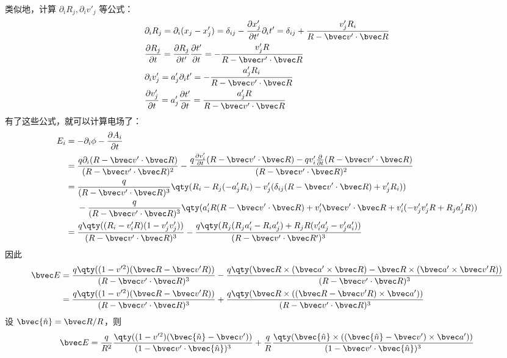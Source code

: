 类似地，计算 $\partial_i R_j,\partial_i v'_j$ 等公式：
\begin{equation}
\begin{aligned}
&\partial_i R_j=\partial_i(x_j-x_j')=\delta_{ij}-\frac{\partial x_j'}{\partial t'}\partial_i t'=\delta_{ij}+\frac{v'_jR_i}{R-\bvec v'\cdot \bvec R}
\\
&\frac{\partial R_j}{\partial t}=\frac{\partial R_j}{\partial t'}\frac{\partial t'}{\partial t}=-\frac{v'_jR}{R-\bvec r'\cdot \bvec R}
\\
&\partial_i v'_j=a'_j\partial_i t'=-\frac{a'_jR_i}{R-\bvec v'\cdot \bvec R}\\
&\frac{\partial v'_j}{\partial t}=a_j'\frac{\partial t'}{\partial t}=\frac{a_j'R}{R-\bvec v'\cdot \bvec R}
\end{aligned}
\end{equation}
有了这些公式，就可以计算电场了：
\begin{equation}
\begin{aligned}
E_i&=-\partial_i \phi - \frac{\partial A_i}{\partial t}
\\
&=\frac{q \partial_i (R-\bvec v'\cdot \bvec R)}{(R-\bvec v'\cdot \bvec R)^2}-\frac{q\frac{\partial v'_i}{\partial t}(R-\bvec v'\cdot \bvec R)-qv'_i\frac{\partial}{\partial t}(R-\bvec v'\cdot \bvec R)}{(R-\bvec v'\cdot \bvec R)^2}
\\
&=\frac{q}{(R-\bvec v'\cdot \bvec R)^3}\qty(R_i-R_j(-a_j'R_i)-v'_j(\delta_{ij}(R-\bvec v'\cdot \bvec R)+v'_jR_i))
\\
&\ \ \ \ -\frac{q}{(R-\bvec v'\cdot \bvec R)^3}\qty(a'_iR(R-\bvec v'\cdot \bvec R)+v'_i\bvec v'\cdot \bvec R+v'_i(-v'_jv'_jR+R_ja'_jR))
\\
&=\frac{q\qty((R_i-v_i'R)(1-v'_jv'_j))}{(R-\bvec v'\cdot \bvec R)^3}-\frac{q\qty(R_j(R_ja'_i-R_ia'_j)+R_jR(v'_ia'_j-v'_ja'_i))}{(R-\bvec v'\cdot \bvec R')^3}\\
\end{aligned}
\end{equation}
因此
\begin{equation}\label{chgrad_eq1}
\begin{aligned}
\bvec E&=\frac{q\qty((1-v'^2)(\bvec R-\bvec v'R))}{(R-\bvec v'\cdot \bvec R)^3}-\frac{q\qty(\bvec R\times (\bvec a'\times \bvec R)- \bvec R\times (\bvec a'\times \bvec v'R))}{(R-\bvec v'\cdot \bvec R)^3}\\
&=\frac{q\qty((1-v'^2)(\bvec R-\bvec v'R))}{(R-\bvec v'\cdot \bvec R)^3}+\frac{q\qty(\bvec R\times ((\bvec R-\bvec v'R)\times \bvec a'))}{(R-\bvec v'\cdot \bvec R)^3}
\end{aligned}
\end{equation}
设 $\bvec{\hat n}=\bvec R/R$，则
\begin{equation}\label{chgrad_eq2}
\bvec E=\frac{q}{R^2}\frac{\qty((1-v'^2)(\bvec {\hat n}-\bvec v'))}{(1-\bvec v'\cdot \bvec{\hat n})^3}+\frac{q}{R}\frac{\qty(\bvec{\hat n}\times ((\bvec{\hat n}-\bvec v')\times \bvec a'))}{(1-\bvec v'\cdot \bvec{\hat n})^3}
\end{equation}

